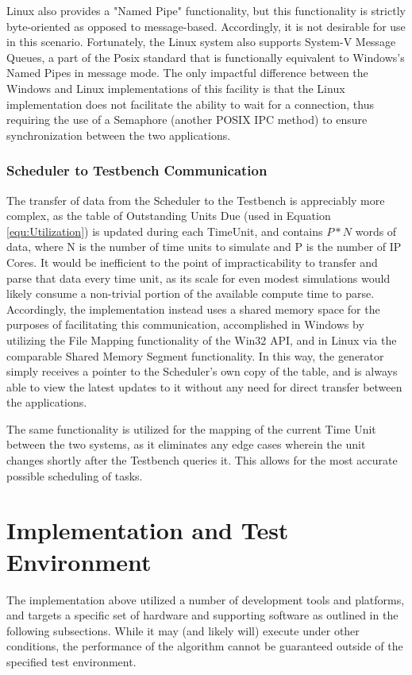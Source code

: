 Linux also provides a "Named Pipe" functionality, but this functionality is strictly byte-oriented as opposed to message-based. Accordingly, it is not desirable for use in this scenario. Fortunately, the Linux system also supports System-V Message Queues, a part of the Posix standard that is functionally equivalent to Windows's Named Pipes in message mode. The only impactful difference between the Windows and Linux implementations of this facility is that the Linux implementation does not facilitate the ability to wait for a connection, thus requiring the use of a Semaphore (another POSIX IPC method) to ensure synchronization between the two applications.

\subsubsection{Scheduler to Testbench Communication}\label{subsubsec:SchedTestbenchIPC}
The transfer of data from the Scheduler to the Testbench is appreciably more complex, as the table of Outstanding Units Due (used in Equation \ref{equ:Utilization}) is updated during each TimeUnit, and contains $P*N$ words of data, where N is the number of time units to simulate and P is the number of IP Cores. It would be inefficient to the point of impracticability to transfer and parse that data every time unit, as its scale for even modest simulations would likely consume a non-trivial portion of the available compute time to parse. Accordingly, the implementation instead uses a shared memory space for the purposes of facilitating this communication, accomplished in Windows by utilizing the File Mapping functionality of the Win32 API, and in Linux via the comparable Shared Memory Segment functionality. In this way, the generator simply receives a pointer to the Scheduler's own copy of the table, and is always able to view the latest updates to it without any need for direct transfer between the applications.

The same functionality is utilized for the mapping of the current Time Unit between the two systems, as it eliminates any edge cases wherein the unit changes shortly after the Testbench queries it. This allows for the most accurate possible scheduling of tasks.

\section{Implementation and Test Environment}\label{sec:environment}
The implementation above utilized a number of development tools and platforms, and targets a specific set of hardware and supporting software as outlined in the following subsections. While it may (and likely will) execute under other conditions, the performance of the algorithm cannot be guaranteed outside of the specified test environment.


